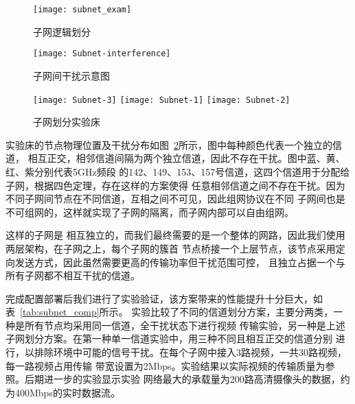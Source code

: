 \begin{figure}[H] %
  \centering
  \texttt{[image: subnet\_exam]}
  \caption{子网逻辑划分}
  \label{fig:subnetexam}
\end{figure}
\begin{figure}[H] %
  \centering
  \texttt{[image: Subnet-interference]}
  \caption{子网间干扰示意图}
  \label{fig:subnet_interference}
\end{figure}
\begin{figure}[h]
  \centering
  \subcaptionbox{}
      {\texttt{[image: Subnet-3]}}
  \hspace{1em}
  \subcaptionbox{}
    {\texttt{[image: Subnet-1]}}
  \hspace{1em}
  \subcaptionbox{}
    {\texttt{[image: Subnet-2]}}
  \caption{子网划分实验床}
  \label{fig:subnet}
\end{figure}

实验床的节点物理位置及干扰分布如图~\ref{fig:subnet_interference}所示，图中每种颜色代表一个独立的信道，
相互正交，相邻信道间隔为两个独立信道，因此不存在干扰。图中蓝、黄、红、紫分别代表5GHz频段
的142、149、153、157号信道，这四个信道用于分配给子网，根据四色定理，存在这样的方案使得
任意相邻信道之间不存在干扰。因为不同子网间节点在不同信道，互相之间不可见，因此组网协议在不同
子网间也是不可组网的，这样就实现了子网的隔离，而子网内部可以自由组网。

这样的子网是
相互独立的，而我们最终需要的是一个整体的网路，因此我们使用两层架构，在子网之上，每个子网的簇首
节点桥接一个上层节点，该节点采用定向发送方式，因此虽然需要更高的传输功率但干扰范围可控，
且独立占据一个与所有子网都不相互干扰的信道。

完成配置部署后我们进行了实验验证，该方案带来的性能提升十分巨大，如表~\ref{tab:subnet_comp}所示。
实验比较了不同的信道划分方案，主要分两类，一种是所有节点均采用同一信道，全干扰状态下进行视频
传输实验，另一种是上述子网划分方案。在第一种单一信道实验中，用三种不同且相互正交的信道分别
进行，以排除环境中可能的信号干扰。在每个子网中接入3路视频，一共30路视频，每一路视频占用传输
带宽设置为2Mbps。实验结果以实际视频的传输质量为参照。后期进一步的实验显示实验
网络最大的承载量为200路高清摄像头的数据，约为400Mbps的实时数据流。

